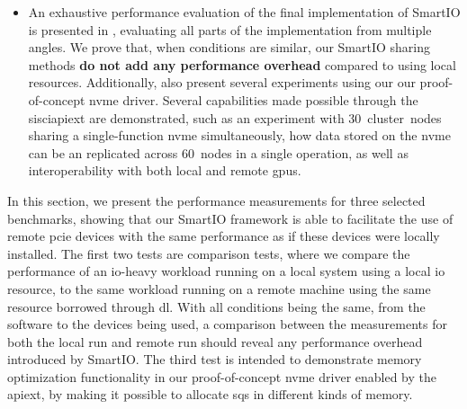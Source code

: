 \begin{itemize}
    \item An exhaustive performance evaluation of the final implementation of SmartIO is presented in , evaluating all parts of the implementation from multiple angles.
        We prove that, when conditions are similar, our SmartIO sharing methods \textbf{do not add any performance overhead} compared to using local resources.
        Additionally,  also present several experiments using our our proof-of-concept \gls{nvme} driver.
        Several capabilities made possible through the \gls{sisciapiext} are demonstrated, such as an experiment with 30~cluster~nodes sharing a single-function \gls{nvme} simultaneously, how data stored on the \gls{nvme} can be  an replicated across 60~nodes in a single operation, as well as interoperability with both local and remote \glspl{gpu}.
\end{itemize}


In this section, we present the performance measurements for three selected benchmarks, showing that our SmartIO framework is able to facilitate the use of remote \gls{pcie} devices with the same performance as if these devices were locally installed.
%
The first two tests are comparison tests, where we compare the performance of an \gls{io}-heavy workload running on a local system using a local \gls{io} resource, to the same workload running on a remote machine using the same resource borrowed through \gls{dl}.
%
With all conditions being the same, from the software to the devices being used, a comparison between the measurements for both the local run and remote run should reveal any performance overhead introduced by SmartIO.
%
The third test is intended to demonstrate memory optimization functionality in our proof-of-concept \gls{nvme} driver enabled by the \gls{apiext}, by making it possible to allocate \glspl{sq} in different kinds of memory.



